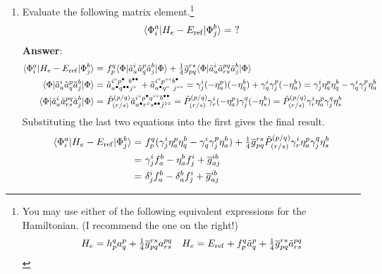 \documentclass[11pt]{article}
\numberwithin{equation}{section}
\begin{document}
\begin{enumerate}
\newpage
\item
  Evaluate the following matrix element.\footnote{You may use either of the following equivalent expressions for the Hamiltonian. (I recommend the one on the right!)
  \begin{align*}
    H_e
  =
    h_p^q
    a^p_q
  +
    \tfrac{1}{4}
    \overline{g}_{pq}^{rs}
    a^{pq}_{rs}
  &&
    H_e
  =
    E_{\mathrm{ref}}
  +
    f_p^q
    \tilde{a}^p_q
  +
    \tfrac{1}{4}
    \overline{g}_{pq}^{rs}
    \tilde{a}^{pq}_{rs}
  \end{align*}
  }
  \begin{align*}
    \langle\Phi _i^a|H_e - E_{\mathrm{ref}}|\Phi _j^b\rangle
  =
    \,\,?
  \end{align*}
  \textbf{Answer}:
  \begin{align*}
    \ip{\F_i^a|H_e - E_\mr{ref}|\F_j^b}
  =&\
    f_p^q
    \ip{\F|
      \tl{a}^i_a
      \tl{a}^p_q
      \tl{a}^b_j
    |\F}
  +
    \tfr{1}{4}
    \ol{g}_{pq}^{rs}
    \ip{\F|
      \tl{a}^i_a
      \tl{a}^{pq}_{rs}
      \tl{a}^b_j
    |\F}
  \\
    \ip{\F|
      \tl{a}^i_a
      \tl{a}^p_q
      \tl{a}^b_j
    |\F}
  =&\
    \tl{a}^{i^\hole p^{\ptcl\phantom{\ptcl}} b^{\ptcl\ptcl}}
          _{a^\ptcl q^{\ptcl\ptcl} j^\hole}
  +
    \tl{a}^{i^\hole p^{\hole\hole} b^\ptcl}
          _{a^\ptcl q^{\hole\phantom{\hole}} j^{\hole\hole}}
  =
    \g^i_j
    (-\h^p_a)
    (-\h^b_q)
  +
    \g^i_q
    \g^p_j
    (-\h^b_a)
  =
    \g^i_j
    \h^p_a
    \h^b_q
  -
    \g^i_q
    \g^p_j
    \h^b_a
  \\
    \ip{\F|
      \tl{a}^i_a
      \tl{a}^{pq}_{rs}
      \tl{a}^b_j
    |\F}
  =&\
    \op{P}^{(p/q)}_{(r/s)}
    \tl{a}^{i^\hole p^\ptcl q^{\hole\hole} b^{\ptcl\ptcl}}
          _{a^\ptcl r^\hole s^{\ptcl\ptcl} j^{\hole\hole}}
  =
    \op{P}^{(p/q)}_{(r/s)}
    \g^i_r
    (-\h^p_a)
    \g^q_j
    (-\h^b_s)
  =
    \op{P}^{(p/q)}_{(r/s)}
    \g^i_r
    \h^p_a
    \g^q_j
    \h^b_s
  \end{align*}
  Substituting the last two equations into the first gives the final result.
  \begin{align*}
    \langle\Phi _i^a|H_e - E_{\mathrm{ref}}|\Phi _j^b\rangle
  =&\
    f_p^q
    (
      \gamma ^i_j
      \eta ^p_a
      \eta ^b_q
    -
      \gamma ^i_q
      \gamma ^p_j
      \eta ^b_a
    )
  +
    \tfrac{1}{4}
    \overline{g}_{pq}^{rs}
    \hat{P}^{(p/q)}_{(r/s)}
    \gamma ^i_r
    \eta ^p_a
    \gamma ^q_j
    \eta ^b_s
  \\=&\
    \gamma ^i_j
    f_a^b
  -
    \eta ^b_a
    f_j^i
  +
    \overline{g}_{aj}^{ib}
  \\=&\
    \delta ^i_j
    f_a^b
  -
    \delta ^b_a
    f_j^i
  +
    \overline{g}_{aj}^{ib}
  \end{align*}

\end{enumerate}
\end{document}
